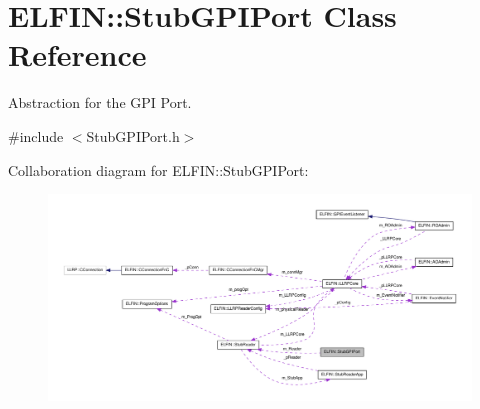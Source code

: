 \hypertarget{class_e_l_f_i_n_1_1_stub_g_p_i_port}{\section{E\-L\-F\-I\-N\-:\-:Stub\-G\-P\-I\-Port Class Reference}
\label{class_e_l_f_i_n_1_1_stub_g_p_i_port}
}


Abstraction for the G\-P\-I Port.  




{\ttfamily \#include $<$Stub\-G\-P\-I\-Port.\-h$>$}



Collaboration diagram for E\-L\-F\-I\-N\-:\-:Stub\-G\-P\-I\-Port\-:
\nopagebreak
\begin{figure}[H]
\begin{center}
\leavevmode
\includegraphics[width=350pt]{class_e_l_f_i_n_1_1_stub_g_p_i_port__coll__graph}
\end{center}
\end{figure}
